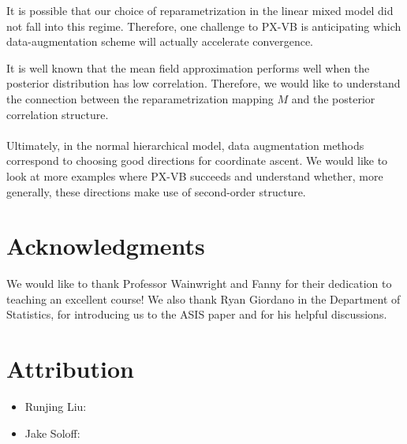 \documentclass{article}
\begin{document}
It is possible that our choice of reparametrization in the linear mixed model did not fall into this regime. Therefore, one challenge to PX-VB is anticipating which data-augmentation scheme will actually accelerate convergence. 

{\color{red} 

It is well known that the mean field approximation performs well when the posterior distribution has low correlation. Therefore, we would like to understand the connection between the reparametrization mapping $M$ and the posterior correlation structure. ~\\~\\

Ultimately, in the normal hierarchical model, data augmentation methods correspond to choosing good directions for coordinate ascent. We would like to look at more examples where PX-VB succeeds and understand whether, more generally, these directions make use of second-order structure.
}

\newpage

\section*{Acknowledgments}
We would like to thank Professor Wainwright and Fanny for their dedication to teaching an excellent course! We also thank Ryan Giordano in the Department of Statistics, for introducing us to the ASIS paper \cite{Yu} and for his helpful discussions.


\section*{Attribution}
\begin{itemize}
\item Runjing Liu: 
\item Jake Soloff: 
\end{itemize}
\end{document}
